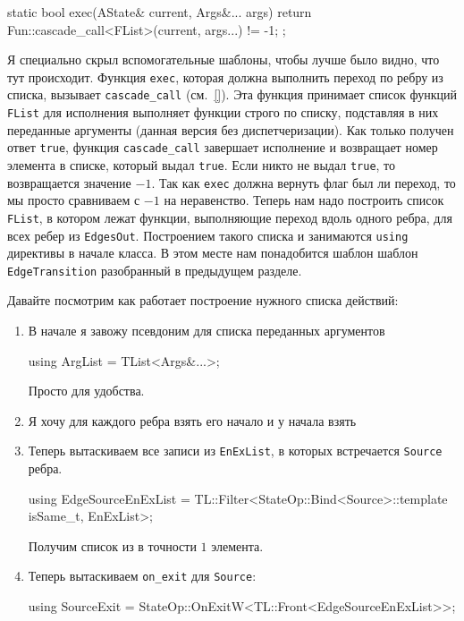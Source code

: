 \documentclass{article}
\begin{document}
{\begin{cppcode}
{  static bool exec(AState& current, Args&... args) {
    return Fun::cascade_call<FList>(current, args...) != -1;
  }
};
\end{cppcode}
Я специально скрыл вспомогательные шаблоны, чтобы лучше было видно, что тут происходит.
Функция \verb"exec", которая должна выполнить переход по ребру из списка, вызывает \verb"cascade_call" (см.~\ref{}).
Эта функция принимает список функций \verb"FList" для исполнения выполняет функции строго по списку, подставляя в них переданные аргументы (данная версия без диспетчеризации).
Как только получен ответ \verb"true", функция \verb"cascade_call" завершает исполнение и возвращает номер элемента в списке, который выдал \verb"true".
Если никто не выдал \verb"true", то возвращается значение $-1$.
Так как \verb"exec" должна вернуть флаг был ли переход, то мы просто сравниваем с $-1$ на неравенство.
Теперь нам надо построить список \verb"FList", в котором лежат функции, выполняющие переход вдоль одного ребра, для всех ребер из \verb"EdgesOut".
Построением такого списка и занимаются \verb"using" директивы в начале класса.
В этом месте нам понадобится шаблон шаблон \verb"EdgeTransition" разобранный в предыдущем разделе.

Давайте посмотрим как работает построение нужного списка действий:
\begin{enumerate}
\item В начале я завожу псевдоним для списка переданных аргументов
\begin{cppcode}[\nonumbers]
using ArgList = TList<Args&...>;
\end{cppcode}
Просто для удобства.

\item Я хочу для каждого ребра взять его начало и у начала взять 

\item Теперь вытаскиваем все записи из \verb"EnExList", в которых встречается \verb"Source" ребра.
\begin{cppcode}[\nonumbers]
using EdgeSourceEnExList =
    TL::Filter<StateOp::Bind<Source>::template isSame_t, EnExList>;
\end{cppcode}
Получим список из в точности $1$ элемента.

\item Теперь вытаскиваем \verb"on_exit" для \verb"Source":
\begin{cppcode}[\nonumbers]
using SourceExit = StateOp::OnExitW<TL::Front<EdgeSourceEnExList>>;
\end{cppcode}


\end{enumerate}}
\end{document}
